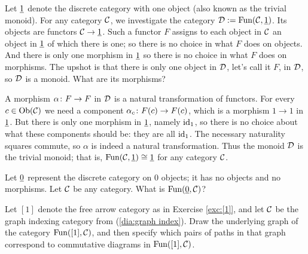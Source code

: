 \documentclass[CT4S-EN-RU]{subfiles}
\begin{document}
\begin{exampleENG}
Let $\underline{1}$ denote the discrete category with one object (also known as the trivial monoid). For any category $\mathcal{C}$, we investigate the category $\mathcal{D}:=\textnormal{Fun}(\mathcal{C},\underline{1})$. Its objects are functors $\mathcal{C}\rightarrow\underline{1}$. Such a functor $F$ assigns to each object in $\mathcal{C}$ an object in $\underline{1}$ of which there is one; so there is no choice in what $F$ does on objects. And there is only one morphism in $\underline{1}$ so there is no choice in what $F$ does on morphisms. The upshot is that there is only one object in $\mathcal{D}$, let's call it $F$, in $\mathcal{D}$, so $\mathcal{D}$ is a monoid. What are its morphisms? 

A morphism $\alpha\colon F\rightarrow F$ in $\mathcal{D}$ is a natural transformation of functors. For every $c\in\textnormal{Ob}(\mathcal{C})$ we need a component $\alpha_c\colon F(c)\rightarrow F(c)$, which is a morphism $1\to 1$ in $\underline{1}$. But there is only one morphism in $\underline{1}$, namely $\textnormal{id}_1$, so there is no choice about what these components should be: they are all $\textnormal{id}_1$. The necessary naturality squares commute, so $\alpha$ is indeed a natural transformation. Thus the monoid $\mathcal{D}$ is the trivial monoid; that is, $\textnormal{Fun}(\mathcal{C},\underline{1})\cong\underline{1}$ for any category $\mathcal{C}$.
\end{exampleENG}

\begin{exampleRUS}
\end{exampleRUS}

\begin{exerciseENG}
Let $\underline{0}$ represent the discrete category on 0 objects; it has no objects and no morphisms. Let $\mathcal{C}$ be any category. What is $\textnormal{Fun}(\underline{0},\mathcal{C})$?
\end{exerciseENG}

\begin{exerciseRUS}
\end{exerciseRUS}

\begin{exerciseENG}
Let $[1]$ denote the free arrow category as in Exercise \ref{exc:[1]}, and let $\mathcal{C}$ be the graph indexing category from (\ref{dia:graph index}). Draw the underlying graph of the category $\textnormal{Fun}([1],\mathcal{C})$, and then specify which pairs of paths in that graph correspond to commutative diagrams in $\textnormal{Fun}([1],\mathcal{C})$.
\end{exerciseENG}

\begin{exerciseRUS}
\end{exerciseRUS}

\end{document}
